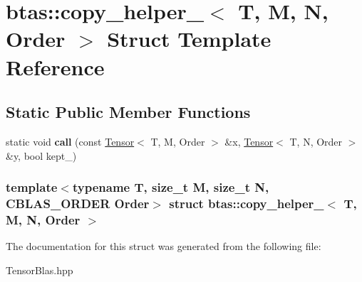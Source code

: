 \hypertarget{structbtas_1_1copy__helper__}{
\section{btas::copy\_\-helper\_\-$<$ T, M, N, Order $>$ Struct Template Reference}
\label{structbtas_1_1copy__helper__}
}
\subsection*{Static Public Member Functions}
\begin{DoxyCompactItemize}
\item 
\hypertarget{structbtas_1_1copy__helper___ac2b3e8d394218a75be2e1a4e805b457c}{
static void {\bfseries call} (const \hyperlink{classbtas_1_1_tensor}{Tensor}$<$ T, M, Order $>$ \&x, \hyperlink{classbtas_1_1_tensor}{Tensor}$<$ T, N, Order $>$ \&y, bool kept\_\-)}
\label{structbtas_1_1copy__helper___ac2b3e8d394218a75be2e1a4e805b457c}

\end{DoxyCompactItemize}
\subsubsection*{template$<$typename T, size\_\-t M, size\_\-t N, CBLAS\_\-ORDER Order$>$ struct btas::copy\_\-helper\_\-$<$ T, M, N, Order $>$}



The documentation for this struct was generated from the following file:\begin{DoxyCompactItemize}
\item 
TensorBlas.hpp\end{DoxyCompactItemize}
